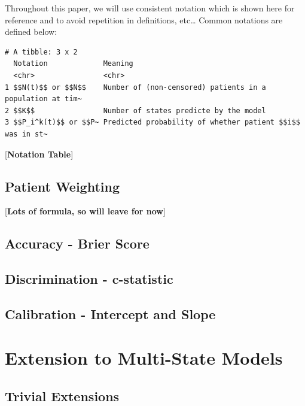 \documentclass[12pt,PhD,twoside,openright]{muthesis}
\begin{document}
Throughout this paper, we will use consistent notation which is shown here for reference and to avoid repetition in definitions, etc\ldots{} Common notations are defined below:
\begin{verbatim}
# A tibble: 3 x 2
  Notation             Meaning                                                  
  <chr>                <chr>                                                    
1 $$N(t)$$ or $$N$$    Number of (non-censored) patients in a population at tim~
2 $$K$$                Number of states predicte by the model                   
3 $$P_i^k(t)$$ or $$P~ Predicted probability of whether patient $$i$$ was in st~
\end{verbatim}
{[}\textbf{Notation Table}{]}

\hypertarget{patient-weighting}{%
\subsection{Patient Weighting}\label{patient-weighting}}

{[}\textbf{Lots of formula, so will leave for now}{]}

\hypertarget{accuracy---brier-score}{%
\subsection{Accuracy - Brier Score}\label{accuracy---brier-score}}

\hypertarget{discrimination---c-statistic}{%
\subsection{Discrimination - c-statistic}\label{discrimination---c-statistic}}

\hypertarget{calibration---intercept-and-slope}{%
\subsection{Calibration - Intercept and Slope}\label{calibration---intercept-and-slope}}

\hypertarget{extension-to-multi-state-models}{%
\section{Extension to Multi-State Models}\label{extension-to-multi-state-models}}

\hypertarget{trivial-extensions}{%
\subsection{Trivial Extensions}\label{trivial-extensions}}
\end{document}
